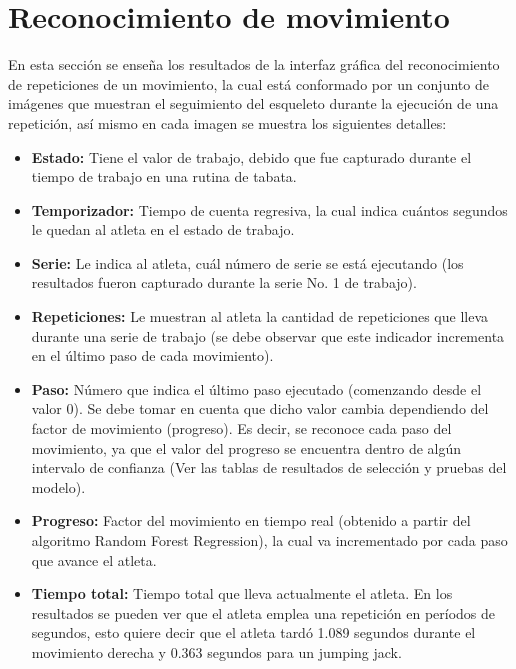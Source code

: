 \section{Reconocimiento de movimiento}
En esta secci\'on se ense\~na los resultados de la interfaz gr\'afica del reconocimiento de repeticiones de un movimiento, la cual est\'a conformado por un conjunto de im\'agenes que muestran el seguimiento del esqueleto durante la ejecuci\'on de una repetici\'on, as\'i mismo en cada imagen se muestra los siguientes detalles:
\begin{itemize}
\item \textbf{Estado:} Tiene el valor de trabajo, debido que fue capturado durante el tiempo de trabajo en una rutina de tabata.
\item \textbf{Temporizador:} Tiempo de cuenta regresiva, la cual indica cu\'antos segundos le quedan al atleta en el estado de trabajo.
\item \textbf{Serie:} Le indica al atleta, cu\'al n\'umero de serie se est\'a ejecutando (los resultados fueron capturado durante la serie No. 1 de trabajo).
\item \textbf{Repeticiones:} Le muestran al atleta la cantidad de repeticiones que lleva durante una   serie de trabajo (se debe observar que este indicador incrementa en el \'ultimo paso de cada movimiento).
\item \textbf{Paso:} N\'umero que indica el \'ultimo paso ejecutado (comenzando desde el valor 0). Se debe tomar en cuenta que dicho valor cambia dependiendo del factor de movimiento (progreso). Es decir, se  reconoce cada paso del movimiento, ya que el valor del progreso se encuentra dentro de alg\'un intervalo de confianza (Ver las tablas de resultados de selecci\'on y pruebas del modelo).
\item \textbf{Progreso:} Factor del movimiento en tiempo real (obtenido a partir del algoritmo Random Forest Regression), la cual va incrementado por cada paso que avance el atleta.
\item \textbf{Tiempo total:} Tiempo total que lleva actualmente el atleta. En los resultados se pueden ver que el atleta emplea una repetici\'on en per\'iodos de segundos, esto quiere decir que el atleta tard\'o 1.089 segundos durante el movimiento derecha y  0.363 segundos para un jumping jack.
\end{itemize}
